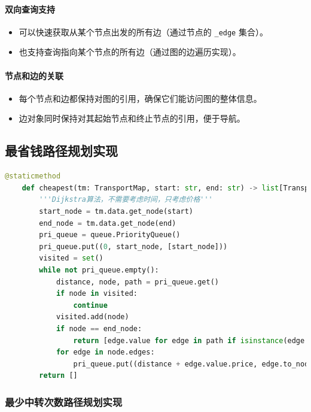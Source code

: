 \documentclass[10pt]{article}
\begin{document}
    \paragraph{双向查询支持}
    \begin{itemize}[label=\textbullet]
        \item 可以快速获取从某个节点出发的所有边（通过节点的 \texttt{\_edge} 集合）。
        \item 也支持查询指向某个节点的所有边（通过图的边遍历实现）。
    \end{itemize}

    \paragraph{节点和边的关联}
    \begin{itemize}[label=\textbullet]
        \item 每个节点和边都保持对图的引用，确保它们能访问图的整体信息。
        \item 边对象同时保持对其起始节点和终止节点的引用，便于导航。
    \end{itemize}

    \subsection{最省钱路径规划实现}
    \begin{lstlisting}[language=Python]
    @staticmethod
    def cheapest(tm: TransportMap, start: str, end: str) -> list[Transport]:
        '''Dijkstra算法，不需要考虑时间，只考虑价格'''
        start_node = tm.data.get_node(start)
        end_node = tm.data.get_node(end)
        pri_queue = queue.PriorityQueue()
        pri_queue.put((0, start_node, [start_node]))
        visited = set()
        while not pri_queue.empty():
            distance, node, path = pri_queue.get()
            if node in visited:
                continue
            visited.add(node)
            if node == end_node:
                return [edge.value for edge in path if isinstance(edge.value, Transport)]
            for edge in node.edges:
                pri_queue.put((distance + edge.value.price, edge.to_node, path + [edge]))
        return []
    \end{lstlisting}

    \subsubsection{最少中转次数路径规划实现}
\end{document}
